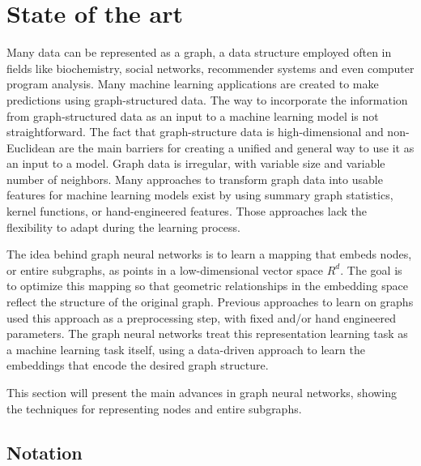 \newpage
\section{State of the art}



Many data can be represented as a graph, a data structure employed often in fields like biochemistry, social networks, recommender systems and even computer program analysis. Many machine learning applications are created to make predictions using graph-structured data. The way to incorporate the information from graph-structured data as an input to a machine learning model is not straightforward. The fact that graph-structure data is high-dimensional and non-Euclidean are the main barriers for creating a unified and general way to use it as an input to a model. Graph data is irregular, with variable size and variable number of neighbors. Many approaches to transform graph data into usable features for machine learning models exist by using summary graph statistics, kernel functions, or hand-engineered features. Those approaches lack the flexibility to adapt during the learning process.



The idea behind graph neural networks is to learn a mapping that embeds nodes, or entire subgraphs, as points in a low-dimensional vector space $R^d$. The goal is to optimize this mapping so that geometric relationships in the embedding space reflect the structure of the original graph. Previous approaches to learn on graphs used this approach as a preprocessing step, with fixed and/or hand engineered parameters. The graph neural networks treat this representation learning task as a machine learning task itself, using a data-driven approach to learn the embeddings that encode the desired graph structure.

This section will present the main advances in graph neural networks, showing the techniques for representing nodes and entire subgraphs.

\subsection{Notation}

